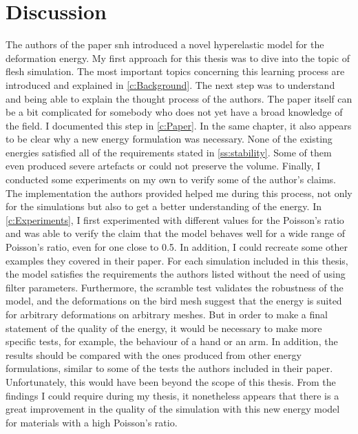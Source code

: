 \section{Discussion}
The authors of the paper \acrshort{snh} introduced a novel hyperelastic model for the deformation energy. My first approach for this thesis was to dive into the topic of flesh simulation. The most important topics concerning this learning process are introduced and explained in \autoref{c:Background}. The next step was to understand and being able to explain the thought process of the authors. The paper itself can be a bit complicated for somebody who does not yet have a broad knowledge of the field. I documented this step in \autoref{c:Paper}. In the same chapter, it also appears to be clear why a new energy formulation was necessary. None of the existing energies satisfied all of the requirements stated in \autoref{ss:stability}. Some of them even produced severe artefacts or could not preserve the volume. Finally, I conducted some experiments on my own to verify some of the author's claims. The implementation the authors provided helped me during this process, not only for the simulations but also to get a better understanding of the energy. In \autoref{c:Experiments}, I first experimented with different values for the Poisson's ratio and was able to verify the claim that the model behaves well for a wide range of Poisson's ratio, even for one close to 0.5. In addition, I could recreate some other examples they covered in their paper. For each simulation included in this thesis, the model satisfies the requirements the authors listed without the need of using filter parameters. Furthermore, the scramble test validates the robustness of the model, and the deformations on the bird mesh suggest that the energy is suited for arbitrary deformations on arbitrary meshes. But in order to make a final statement of the quality of the energy, it would be necessary to make more specific tests, for example, the behaviour of a hand or an arm. In addition, the results should be compared with the ones produced from other energy formulations, similar to some of the tests the authors included in their paper. Unfortunately, this would have been beyond the scope of this thesis. From the findings I could require during my thesis, it nonetheless appears that there is a great improvement in the quality of the simulation with this new energy model for materials with a high Poisson's ratio.
